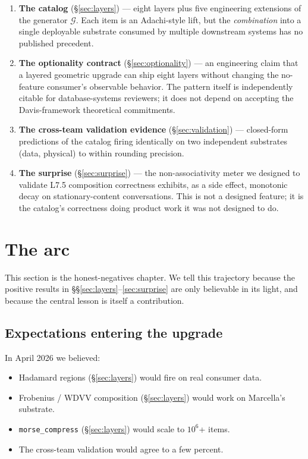 \documentclass[11pt,letterpaper]{article}
\begin{document}
\begin{enumerate}[nosep]
\item \textbf{The catalog} (\S\ref{sec:layers}) --- eight layers plus
  five engineering extensions of the generator $\mathcal{G}$. Each
  item is an Adachi-style lift, but the \emph{combination} into a
  single deployable substrate consumed by multiple downstream systems
  has no published precedent.
\item \textbf{The optionality contract} (\S\ref{sec:optionality}) ---
  an engineering claim that a layered geometric upgrade can ship
  eight layers without changing the no-feature consumer's observable
  behavior. The pattern itself is independently citable for
  database-systems reviewers; it does not depend on accepting the
  Davis-framework theoretical commitments.
\item \textbf{The cross-team validation evidence}
  (\S\ref{sec:validation}) --- closed-form predictions of the catalog
  firing identically on two independent substrates (data, physical)
  to within rounding precision.
\item \textbf{The surprise} (\S\ref{sec:surprise}) --- the
  non-associativity meter we designed to validate L7.5 composition
  correctness exhibits, as a side effect, monotonic decay on
  stationary-content conversations. This is not a designed feature;
  it is the catalog's correctness doing product work it was not
  designed to do.
\end{enumerate}


\section{The arc}
\label{sec:arc}

This section is the honest-negatives chapter. We tell this trajectory
because the positive results in
\S\S\ref{sec:layers}--\ref{sec:surprise} are only believable in its
light, and because the central lesson is itself a contribution.

\subsection{Expectations entering the upgrade}

In April 2026 we believed:

\begin{itemize}[nosep]
\item Hadamard regions (\S\ref{sec:layers}) would fire on real
  consumer data.
\item Frobenius / WDVV composition (\S\ref{sec:layers}) would work on
  Marcella's substrate.
\item \texttt{morse\_compress} (\S\ref{sec:layers}) would scale to
  $10^6$+ items.
\item The cross-team validation would agree to a few percent.
\end{itemize}
\end{document}

